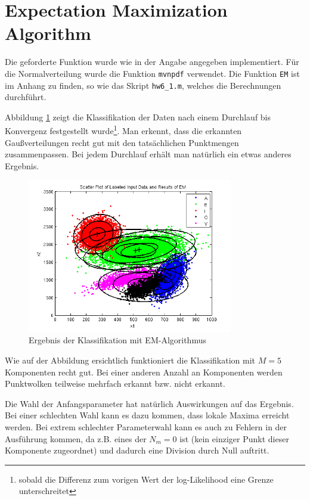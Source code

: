 \section{Expectation Maximization Algorithm}

Die geforderte Funktion wurde wie in der Angabe angegeben implementiert. Für die Normalverteilung wurde die Funktion \texttt{mvnpdf} verwendet. Die Funktion \texttt{EM} ist im Anhang zu finden, so wie das Skript \texttt{hw6\_1.m}, welches die Berechnungen durchführt.

Abbildung \ref{fig:6_1_EM_classification} zeigt die Klassifikation der Daten nach einem Durchlauf bis Konvergenz festgestellt wurde\footnote{sobald die Differenz zum vorigen Wert der log-Likelihood eine Grenze unterschreitet}. Man erkennt, dass die erkannten Gaußverteilungen recht gut mit den tatsächlichen Punktmengen zusammenpassen. Bei jedem Durchlauf erhält man natürlich ein etwas anderes Ergebnis.

\begin{figure}[h!]
  \centering
	\includegraphics[width=0.8\textwidth]{./figures/6_1_EM_classification.png}
	\caption{Ergebnis der Klassifikation mit EM-Algorithmus}
	\label{fig:6_1_EM_classification}
\end{figure}

Wie auf der Abbildung ersichtlich funktioniert die Klassifikation mit $M=5$ Komponenten recht gut. Bei einer anderen Anzahl an Komponenten werden Punktwolken teilweise mehrfach erkannt bzw. nicht erkannt.

Die Wahl der Anfangsparameter hat natürlich Auswirkungen auf das Ergebnis. Bei einer schlechten Wahl kann es dazu kommen, dass lokale Maxima erreicht werden. Bei extrem schlechter Parameterwahl kann es auch zu Fehlern in der Ausführung kommen, da z.B. eines der $N_m = 0$ ist (kein einziger Punkt dieser Komponente zugeordnet) und dadurch eine Division durch Null auftritt.

